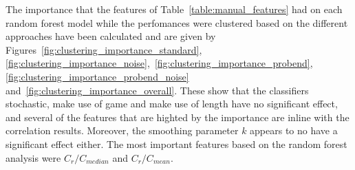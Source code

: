\documentclass{article}
\begin{document}
The importance that the features of Table~\ref{table:manual_features} had on
each random forest model while the perfomances were clustered based on the
different approaches have been
calculated and are given by Figures~\ref{fig:clustering_importance_standard},
\ref{fig:clustering_importance_noise},~\ref{fig:clustering_importance_probend},
\ref{fig:clustering_importance_probend_noise}
and~\ref{fig:clustering_importance_overall}. These show that the classifiers
stochastic, make use of game and make use of length have no significant effect,
and several of the features that are highted by the importance are inline with
the correlation results. Moreover, the smoothing parameter \(k\) appears to no
have a significant effect either. The most important features based on the
random forest analysis were $C_{r} / C_{median}$ and $C_r / C_{mean}$.
\end{document}

